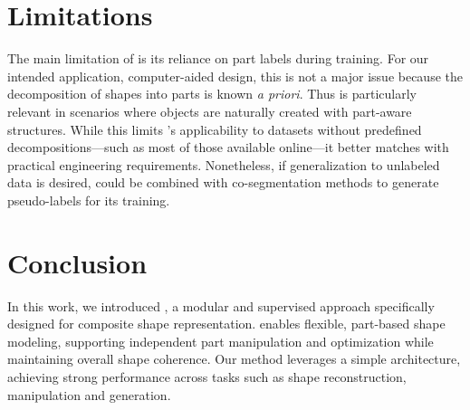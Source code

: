 
\section{Limitations}
\label{sec:limitations}

The main limitation of \PSDF{} is its reliance on part labels during training. For our intended application, computer-aided design, this is not a major issue because the decomposition of shapes into parts is known \textit{a priori}. Thus \PSDF{} is particularly relevant in scenarios where objects are naturally created with part-aware structures. While this limits \PSDF{}’s applicability to datasets without predefined decompositions—such as most of those available online—it better matches with practical engineering requirements. Nonetheless, if generalization to unlabeled data is desired, \PSDF{} could be combined with co-segmentation methods to generate pseudo-labels for its training. 




\section{Conclusion}
\label{sec:conclusion}

In this work, we introduced \PSDF{}, a modular and supervised approach specifically designed for composite shape representation. \PSDF{} enables flexible, part-based shape modeling, supporting independent part manipulation and optimization while maintaining overall shape coherence. Our method leverages a simple architecture, achieving strong performance across tasks such as shape reconstruction, manipulation and generation.

